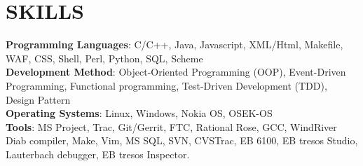 
\section{SKILLS}
\textbf{Programming Languages}: C/C++, Java, Javascript, XML/Html, Makefile, WAF, CSS, Shell, Perl, Python, SQL, Scheme\\
\textbf{Development Method}:
Object-Oriented Programming (OOP),
Event-Driven Programming,
Functional programming,
Test-Driven Development (TDD),
Design Pattern\\
\textbf{Operating Systems}: Linux, Windows, Nokia OS, OSEK-OS\\
\textbf{Tools}:
MS Project, Trac, Git/Gerrit, FTC, Rational Rose,
GCC, WindRiver Diab compiler, Make,
Vim, MS SQL, SVN, CVSTrac,
EB 6100, EB tresos Studio, Lauterbach debugger, EB tresos Inspector. \\

